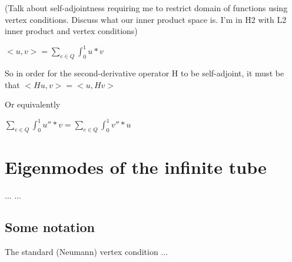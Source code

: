 \documentclass[12pt]{article}
\begin{document}
\centerline{}
  
(Talk about self-adjointness requiring me to restrict domain of functions using vertex conditions. Discuss what our inner product space is. I'm in H2 with L2 inner product and vertex conditions) 

$<u, v> = \sum\nolimits_{e \in Q} \int_{0}^{1}u*v$

So in order for the second-derivative operator H to be self-adjoint, it must be that $<Hu, v> = <u, Hv> $

Or equivalently

$\sum\nolimits_{e \in Q} \int_{0}^{1}u''*v= \sum\nolimits_{e \in Q} \int_{0}^{1}v''*u$

\section{Eigenmodes of the infinite tube} %

... ...


\subsection{Some notation}

The standard (Neumann) vertex condition ...
\end{document}

